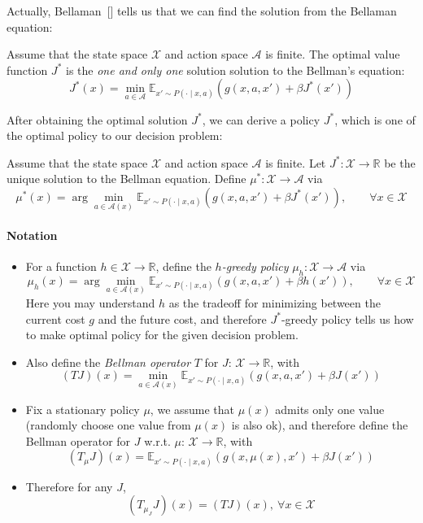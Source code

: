 Actually, Bellaman~[\cite{ber1995}] tells us that we can find the solution from the Bellaman equation:
\begin{theorem}
Assume that the state space $\mathcal{X}$ and action space $\mathcal{A}$ is finite.
The optimal value function $J^*$ is the \emph{one and only one} solution solution to the Bellman's equation:
\begin{equation}
J^*(x)=\min_{a\in\mathcal{A}}
\mathbb{E}_{x'\sim P(\cdot\mid x,a)}
\left(
g(x,a,x')+\beta J^*(x')
\right)
\end{equation}
\end{theorem}

After obtaining the optimal solution $J^*$, we can derive a policy $J^*$, which is one of the optimal policy to our decision problem:
\begin{theorem}
Assume that the state space $\mathcal{X}$ and action space $\mathcal{A}$ is finite.
Let $J^*:\mathcal{X}\to\mathbb{R}$ be the unique solution to the Bellman equation.
Define $\mu^*:\mathcal{X}\to\mathcal{A}$ via
\[
\mu^*(x)=\arg\min_{a\in\mathcal{A}(x)}\mathbb{E}_{x'\sim P(\cdot\mid x,a)}
\left(
g(x,a,x')+\beta J^*(x')
\right),\qquad
\forall x\in\mathcal{X}
\]
\end{theorem}

\paragraph{Notation}
\begin{itemize}
\item
For a function $h\in\mathcal{X}\to\mathbb{R}$, define the \emph{$h$-greedy policy} $\mu_h:\mathcal{X}\to\mathcal{A}$ via
\[
\mu_h(x)=\arg\min_{a\in\mathcal{A}(x)}\mathbb{E}_{x'\sim P(\cdot\mid x,a)}
\left(
g(x,a,x')+\beta h(x')
\right),\qquad
\forall x\in\mathcal{X}
\]
Here you may understand $h$ as the tradeoff for minimizing between the current cost $g$ and the future cost, and therefore $J^*$-greedy policy tells us how to make optimal policy for the given decision problem.
\item
Also define the \emph{Bellman operator} $T$ for $J$: $\mathcal{X}\to\mathbb{R}$, with
\begin{equation}
(TJ)(x) = \min_{a\in\mathcal{A}(x)}\mathbb{E}_{x'\sim P(\cdot\mid x,a)}
\left(
g(x,a,x')+\beta J(x')
\right)
\end{equation}
\item
Fix a stationary policy $\mu$, we assume that $\mu(x)$ admits only one value (randomly choose one value from $\mu(x)$ is also ok), and therefore define the Bellman operator for $J$ w.r.t. $\mu$: $\mathcal{X}\to\mathbb{R}$, with
\begin{equation}
(T_\mu J)(x) = \mathbb{E}_{x'\sim P(\cdot\mid x,a)}
\left(
g(x,\mu(x),x')+\beta J(x')
\right)
\end{equation}
\item
Therefore for any $J$, 
\begin{equation}
(T_{\mu_J}J)(x)=(TJ)(x),\ \forall x\in\mathcal{X}
\end{equation}
\end{itemize}

